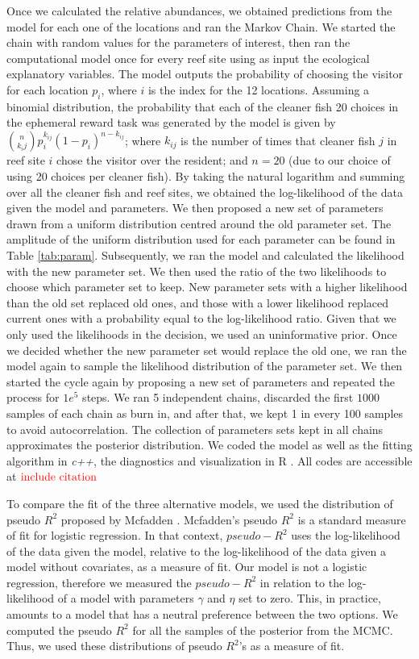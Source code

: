 \documentclass[]{rsos}%
\begin{document}
Once we calculated the relative abundances, we obtained predictions from
the model for each one of the locations and ran the Markov Chain. We started the
chain with random values for the parameters of interest, then ran the
computational model once for every reef site using as input the ecological
explanatory variables. The model outputs the probability of choosing the visitor
for each location \(p_i\), where \(i\) is the index for the 12 locations. Assuming a
binomial distribution, the probability that each of the cleaner fish 20 choices
in the ephemeral reward task was generated by the model
is given by \(\binom{n}{k_ij}p^{k_{ij}}_i (1-p_i)^{n-k_{ij}}\);
where \(k_{ij}\) is the number of times that cleaner fish \(j\) in reef site \(i\)
chose the visitor over the resident; and \(n=20\) (due to our choice of using 20
choices per cleaner fish). By taking the natural logarithm and summing over all
the cleaner fish and reef sites, we obtained the log-likelihood of the data
given the model and parameters. We then proposed a new set of parameters drawn
from a uniform distribution centred around the old parameter set. The amplitude
of the uniform distribution used for each parameter can be found in Table
\ref{tab:param}. Subsequently, we ran the model and calculated the likelihood
with the new parameter set. We then used the ratio of the two likelihoods to
choose which parameter set to keep. New parameter sets with a higher likelihood
than the old set replaced old ones, and those with a lower likelihood replaced
current ones with a probability equal to the log-likelihood ratio.
Given that we only used the likelihoods in the decision, we used an
uninformative prior. Once we decided whether the new parameter set
would replace the old one, we ran the model again to sample the likelihood
distribution of the parameter set. We then started
the cycle again by proposing a new set of parameters and repeated
the process for \(1e^5\) steps. We ran 5 independent chains,
discarded the first \(1000\) samples of each chain as burn in,
and after that, we kept 1 in every 100 samples to avoid autocorrelation.
The collection of parameters sets kept in
all chains approximates the posterior distribution. We coded the model
as well as the fitting algorithm in \emph{c++}, the diagnostics and visualization
in R \citep{rcoreteam_Language_2021}. All codes are accessible at
\(\color{red}{\text{include citation}}\)

To compare the fit of the three alternative models, we used the
distribution of pseudo \(R^2\) proposed by Mcfadden \citep{mcfadden_Conditional_1974}.
Mcfadden's pseudo \(R^2\) is a standard measure of fit for logistic regression.
In that context, \(pseudo-R^2\) uses the log-likelihood of the data given
the model, relative to the log-likelihood of the data given a
model without covariates, as a measure of fit. Our
model is not a logistic regression, therefore we measured the \(pseudo-R^2\) in
relation to the log-likelihood of a model
with parameters \(\gamma\) and \(\eta\) set to zero. This, in practice,
amounts to a model that has a neutral preference between the two options.
We computed the pseudo \(R^2\) for all the samples of the posterior from
the MCMC. Thus, we used these distributions of pseudo \(R^2\)'s as a measure of
fit.
\end{document}
